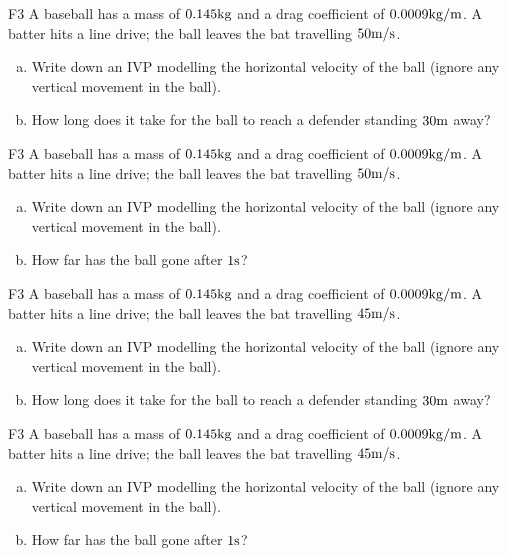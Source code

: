 \begin{problem}{F3}
A baseball has a mass of \(0.145 {\rm kg}\) and a drag coefficient of \(0.0009 {\rm kg/m}\).  A batter hits a line drive; the ball leaves the bat travelling \(50 {\rm m/s}\). 
\begin{enumerate}[(a)]
\item Write down an IVP modelling the horizontal velocity of the ball (ignore any vertical movement in the ball).
\item How long does it take for the ball to reach a defender standing \(30 {\rm m}\) away?
\end{enumerate}
\end{problem}

\begin{problem}{F3}
A baseball has a mass of \(0.145 {\rm kg}\) and a drag coefficient of \(0.0009 {\rm kg/m}\).  A batter hits a line drive; the ball leaves the bat travelling \(50 {\rm m/s}\). 
\begin{enumerate}[(a)]
\item Write down an IVP modelling the horizontal velocity of the ball (ignore any vertical movement in the ball).
\item How far has the ball gone after \(1 {\rm s}\)?
\end{enumerate}
\end{problem}

\begin{problem}{F3}
A baseball has a mass of \(0.145 {\rm kg}\) and a drag coefficient of \(0.0009 {\rm kg/m}\).  A batter hits a line drive; the ball leaves the bat travelling \(45 {\rm m/s}\). 
\begin{enumerate}[(a)]
\item Write down an IVP modelling the horizontal velocity of the ball (ignore any vertical movement in the ball).
\item How long does it take for the ball to reach a defender standing \(30 {\rm m}\) away?
\end{enumerate}
\end{problem}

\begin{problem}{F3}
A baseball has a mass of \(0.145 {\rm kg}\) and a drag coefficient of \(0.0009 {\rm kg/m}\).  A batter hits a line drive; the ball leaves the bat travelling \(45 {\rm m/s}\). 
\begin{enumerate}[(a)]
\item Write down an IVP modelling the horizontal velocity of the ball (ignore any vertical movement in the ball).
\item How far has the ball gone after \(1 {\rm s}\)?
\end{enumerate}
\end{problem}



